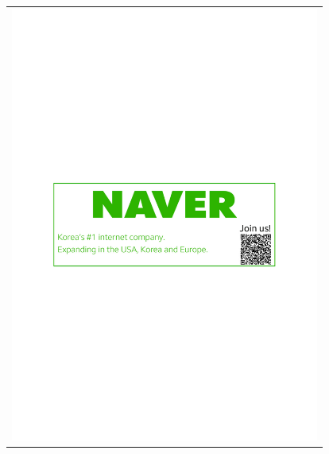\thispagestyle{empty}
\thispagestyle{empty}
\begin{center}
\begin{tabular}{c}
  \includegraphics[width=4in]{content/ads/silver/Naver_EMNLP_2021_print_ad.jpg.pdf} \\

\end{tabular}
\end{center}
